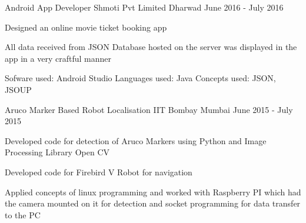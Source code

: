\begin{cventries}
  \cventry
    {Android App Developer}
    {Shmoti Pvt Limited}
    {Dharwad}
    {June 2016 - July 2016}
    {
      \begin{cvitems}
        \item {Designed an online movie ticket booking app}
        \item {All data received from JSON Database hosted on the server was displayed in the app in a very craftful manner}
        \item {Sofware used: Android Studio \vspace{2em} Languages used: Java Concepts used: JSON, JSOUP}
      \end{cvitems}
    }
  \cventry
    {Aruco Marker Based Robot Localisation}
    {IIT Bombay}
    {Mumbai}
    {June 2015 - July 2015}
    {
      \begin{cvitems}
        \item {Developed code for detection of Aruco Markers using Python and Image Processing Library Open CV}
        \item {Developed code for Firebird V Robot for navigation}
         \item {Applied concepts of linux programming and worked with Raspberry PI which had the camera mounted on it for detection and socket programming for data transfer to the PC}
      \end{cvitems}
    }
\end{cventries}
  
